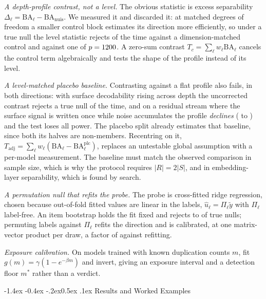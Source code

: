 \documentclass[10pt,letterpaper]{article}
\makeatletter
\renewcommand\section{\@startsection{section}{1}{\z@}%
  {-1.4ex \@plus -0.4ex \@minus -.2ex}{0.5ex \@plus .1ex}%
  {\normalfont\normalsize\bfseries}}
\newcommand{\BA}{\mathrm{BA}}
\newcommand{\nuis}{\mathrm{nuis}}
\makeatother
\begin{document}
\textit{A depth-profile contrast, not a level.} The obvious statistic is
excess separability $\Delta_\ell = \BA_\ell - \BA_{\nuis}$. We measured it and
discarded it: at matched degrees of freedom a smaller control block estimates
its direction more efficiently, so under a true null the level statistic
rejects \CapMaxMatch{} of the time against a dimension-matched control and
\CapMaxHuge{} against one of $p=1200$. A zero-sum contrast
$T_c=\sum_\ell w_\ell \BA_\ell$ cancels the control term algebraically and
tests the shape of the profile instead of its level.

\textit{A level-matched placebo baseline.} Contrasting against a flat profile
also fails, in both directions: with surface decodability rising across depth
the uncorrected contrast rejects a true null \SlopeARawFifty{} of the time, and
on a residual stream where the surface signal is written once while noise
accumulates the profile \emph{declines} (\ProfNullFirstB{} to
\ProfNullLastB{}) and the test loses all power. The placebo split already
estimates that baseline, since both its halves are non-members. Recentring on
it, $T_{\mathrm{adj}}=\sum_\ell w_\ell(\BA_\ell-\BA^{\mathrm{plc}}_\ell)$,
replaces an untestable global assumption with a per-model measurement. The
baseline must match the observed comparison in sample size, which is why the
protocol requires $|R|=2|S|$, and in embedding-layer separability, which is
found by search.

\textit{A permutation null that refits the probe.} The probe is cross-fitted
ridge regression, chosen because out-of-fold fitted values are linear in the
labels, $\hat u_\ell = \Pi_\ell\tilde y$ with $\Pi_\ell$ label-free. An item
bootstrap holds the fit fixed and rejects \BootMin{} to \BootMax{} of true
nulls;
permuting labels against $\Pi_\ell$ refits the direction and is calibrated,
at one matrix-vector product per draw, a factor of \TimeSpeedup{} against
refitting.

\textit{Exposure calibration.} On models trained with known duplication counts $m$, fit $g(m)=\gamma(1-e^{-\beta m})$ and invert, giving an exposure interval and a detection floor $m^{*}$ rather than a verdict.

\section{Results and Worked Examples}
\end{document}
